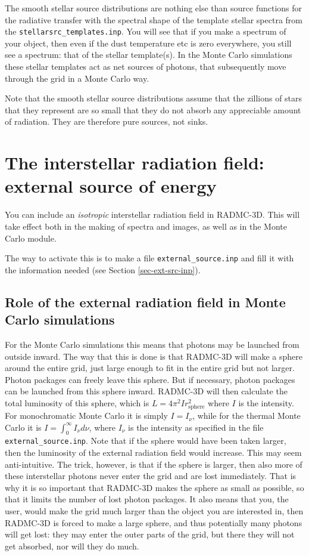 \documentclass{report}
\begin{document}
The smooth stellar source distributions are nothing else than source
functions for the radiative transfer with the spectral shape of the template
stellar spectra from the {\small\tt stellarsrc\_templates.inp}.  You will
see that if you make a spectrum of your object, then even if the dust
temperature etc is zero everywhere, you still see a spectrum: that of the
stellar template(s). In the Monte Carlo simulations these stellar templates
act as net sources of photons, that subsequently move through the grid in a
Monte Carlo way. 

Note that the smooth stellar source distributions assume that the zillions
of stars that they represent are so small that they do not absorb any
appreciable amount of radiation. They are therefore pure sources, not sinks.


\section{The interstellar radiation field: external source of energy}
\label{sec-external-source}
%
You can include an {\em isotropic} interstellar radiation field in
RADMC-3D. This will take effect both in the making of spectra and images, as
well as in the Monte Carlo module.

The way to activate this is to make a file {\small\tt external\_source.inp}
and fill it with the information needed (see Section \ref{sec-ext-src-inp}).

\subsection{Role of the external radiation field in Monte Carlo simulations}
For the Monte Carlo simulations this means that photons may be launched from
outside inward. The way that this is done is that RADMC-3D will make a
sphere around the entire grid, just large enough to fit in the entire grid
but not larger. Photon packages can freely leave this sphere. But if
necessary, photon packages can be launched from this sphere inward.
RADMC-3D will then calculate the total luminosity of this sphere, which is
$L=4\pi^2 I r_{\mathrm{sphere}}^2$ where $I$ is the intensity. For
monochromatic Monte Carlo it is simply $I=I_\nu$, while for the thermal
Monte Carlo it is $I=\int_0^\infty I_\nu d\nu$, where $I_\nu$ is the
intensity as specified in the file {\small\tt external\_source.inp}.  Note
that if the sphere would have been taken larger, then the luminosity of the
external radiation field would increase. This may seem anti-intuitive. The
trick, however, is that if the sphere is larger, then also more of these
interstellar photons never enter the grid and are lost immediately. That is
why it is so important that RADMC-3D makes the sphere as small as possible,
so that it limits the number of lost photon packages. It also means that you,
the user, would make the grid much larger than the object you are interested
in, then RADMC-3D is forced to make a large sphere, and thus potentially
many photons will get lost: they may enter the outer parts of the grid, but
there they will not get absorbed, nor will they do much. 
\end{document}

